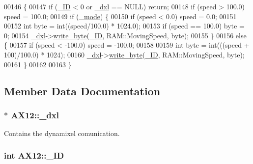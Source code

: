 \begin{DoxyCode}
00146 \{
00147     \textcolor{keywordflow}{if} (\hyperlink{a00001_a0ae2b35fee3d120075e1d8f1e2055804}{\_ID} < 0 or \hyperlink{a00001_a16df7ccc0a8d3c585a93b6916734bb17}{\_dxl} == NULL) \textcolor{keywordflow}{return};
00148     \textcolor{keywordflow}{if} (speed > 100.0) speed = 100.0;
00149     \textcolor{keywordflow}{if} (\hyperlink{a00001_a2fd07e2e636003227a32d09d211bd6d4}{\_mode}) \{
00150         \textcolor{keywordflow}{if} (speed < 0.0) speed = 0.0;
00151         
00152         \textcolor{keywordtype}{int} byte = int((speed/100.0) * 1024.0);
00153         \textcolor{keywordflow}{if} (speed == 100.0) byte = 0;
00154         \hyperlink{a00001_a16df7ccc0a8d3c585a93b6916734bb17}{\_dxl}->\hyperlink{a00004_a66c1e32cc45dd46d329f1fc212e46a3d}{write\_byte}(\hyperlink{a00001_a0ae2b35fee3d120075e1d8f1e2055804}{\_ID}, RAM::MovingSpeed, byte);        
00155     \}
00156     \textcolor{keywordflow}{else} \{
00157         \textcolor{keywordflow}{if} (speed < -100.0) speed = -100.0;   
00158         
00159         \textcolor{keywordtype}{int} byte = int(((speed + 100)/100.0) * 1024);
00160         \hyperlink{a00001_a16df7ccc0a8d3c585a93b6916734bb17}{\_dxl}->\hyperlink{a00004_a66c1e32cc45dd46d329f1fc212e46a3d}{write\_byte}(\hyperlink{a00001_a0ae2b35fee3d120075e1d8f1e2055804}{\_ID}, RAM::MovingSpeed, byte);
00161     \}
00162 
00163 \}
\end{DoxyCode}


\subsection{Member Data Documentation}
\hypertarget{a00001_a16df7ccc0a8d3c585a93b6916734bb17}{}
\subsubsection[{\+\_\+dxl}]{$\ast$ A\+X12\+::\+\_\+dxl\hspace{0.3cm}{\ttfamily [private]}}\label{a00001_a16df7ccc0a8d3c585a93b6916734bb17}


Contains the dynamixel comunication. 

\hypertarget{a00001_a0ae2b35fee3d120075e1d8f1e2055804}{}
\subsubsection[{\+\_\+\+I\+D}]{\setlength{\rightskip}{0pt plus 5cm}int A\+X12\+::\+\_\+\+I\+D\hspace{0.3cm}{\ttfamily [private]}}\label{a00001_a0ae2b35fee3d120075e1d8f1e2055804}


